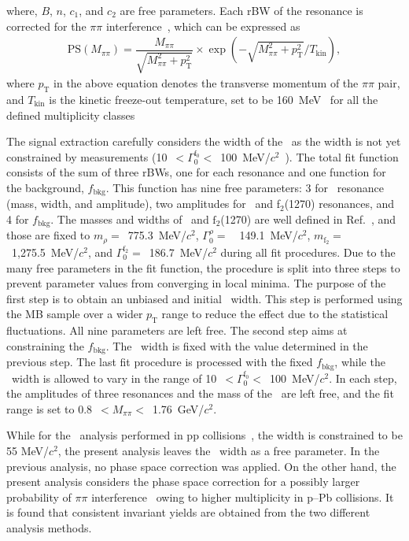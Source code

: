 where, $B$, $n$, $c_{1}$, and $c_{2}$ are free parameters. Each rBW of the resonance is corrected for the $\pi\pi$ interference~\cite{ALICE:2018qdv, Rapp:2003ar}, which can be expressed as
\begin{eqnarray}
\mathrm{PS}(M_{\pi\pi}) = \dfrac{M_{\pi\pi}}{\sqrt{M_{\pi\pi}^{2}+p_{\mathrm{T}}^{2}}}\times\exp{(-\sqrt{M_{\pi\pi}^{2}+p_{\mathrm{T}}^{2}}/T_{\mathrm{kin}})},
\label{eq:ps}
\end{eqnarray} 
where $p_{\mathrm{T}}$ in the above equation denotes the transverse momentum of the $\pi\pi$ pair, and $T_{\mathrm{kin}}$ is the kinetic freeze-out temperature, set to be 160~MeV~\cite{ALICE:2018qdv} for all the defined multiplicity classes

The signal extraction carefully considers the width of the \fzero~as the width is not yet constrained by measurements (10~$<\Gamma_{0}^{\mathrm{f}_{0}}<$~100~MeV/$c^{2}$~\cite{ParticleDataGroup:2022pth}). The total fit function consists of the sum of three rBWs, one for each resonance and one function for the background, $f_{\mathrm{bkg}}$. This function has nine free parameters: 3 for \fzero~resonance (mass, width, and amplitude), two amplitudes for \rhoz~and f$_{2}$(1270) resonances, and 4 for $f_{\mathrm{bkg}}$. The masses and widths of \rhoz~and $\mathrm{f}_{2}$(1270) are well defined in Ref.~\cite{ParticleDataGroup:2022pth}, and those are fixed to $m_{\rho}=$~775.3~MeV/$c^{2}$, $\Gamma^{\rho}_{0}=$~~149.1~MeV/$c^{2}$, $m_{\mathrm{f}_{2}}=$~1,275.5~MeV/$c^{2}$, and $\Gamma^{\mathrm{f}_{2}}_{0}=$~186.7~MeV/$c^{2}$ during all fit procedures. Due to the many free parameters in the fit function, the procedure is split into three steps to prevent parameter values from converging in local minima. The purpose of the first step is to obtain an unbiased and initial \fzero~width. This step is performed using the MB sample over a wider $p_{\mathrm{T}}$ range to reduce the effect due to the statistical fluctuations. All nine parameters are left free. The second step aims at constraining the $f_{\mathrm{bkg}}$. The \fzero~width is fixed with the value determined in the previous step. The last fit procedure is processed with the fixed $f_{\mathrm{bkg}}$, while the \fzero~width is allowed to vary in the range of 10~$<\Gamma_{0}^{\mathrm{f}_{0}}<$~100~MeV/$c^{2}$. In each step, the amplitudes of three resonances and the mass of the \fzero~are left free, and the fit range is set to 0.8~$<M_{\pi\pi}<$~1.76~GeV/$c^{2}$.


While for the \fzero~analysis performed in pp collisions~\cite{ALICE:2022qnb}, the width is constrained to be 55 MeV/$c^{2}$, the present analysis leaves the \fzero~width as a free parameter. In the previous analysis, no phase space correction was applied. On the other hand, the present analysis considers the phase space correction for a possibly larger probability of $\pi\pi$ interference~\cite{STAR:2003vqj} owing to higher multiplicity in p--Pb collisions. It is found that consistent invariant yields are obtained from the two different analysis methods.

